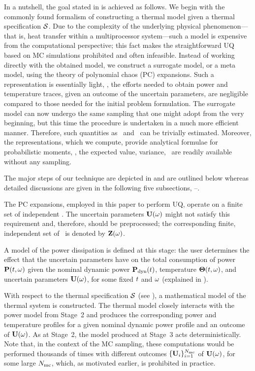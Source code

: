 In a nutshell, the goal stated in  is achieved as follows. We begin with the commonly found formalism of constructing a thermal model given a thermal specification $\mathcal{S}$. Due to the complexity of the underlying physical phenomenon---that is, heat transfer within a multiprocessor system---such a model is expensive from the computational perspective; this fact makes the straightforward UQ based on MC simulations prohibited and often infeasible. Instead of working directly with the obtained model, we construct a surrogate model, or a meta model, using the theory of polynomial chaos (PC) expansions. Such a representation is essentially light, \ie, the efforts needed to obtain power and temperature traces, given an outcome of the uncertain parameters, are negligible compared to those needed for the initial problem formulation. The surrogate model can now undergo the same sampling that one might adopt from the very beginning, but this time the procedure is undertaken in a much more efficient manner. Therefore, such quantities as \cdfs\ and \pdfs\ can be trivially estimated. Moreover, the representations, which we compute, provide analytical formulae for probabilistic moments, \ie, the expected value, variance, \etc\ are readily available without any sampling.

The major steps of our technique are depicted in  and are outlined below whereas detailed discussions are given in the following five subsections, --.

 The PC expansions, employed in this paper to perform UQ, operate on a finite set of independent \rvs. The uncertain parameters $\mathbf{U}(\omega)$ might not satisfy this requirement and, therefore, should be preprocessed; the corresponding finite, independent set of \rvs\ is denoted by $\mathbf{Z}(\omega)$.

 A model of the power dissipation is defined at this stage: the user determines the effect that the uncertain parameters have on the total consumption of power $\mathbf{P}(t, \omega)$ given the nominal dynamic power $\mathbf{P}_{\text{dyn}}(t)$, temperature ${\boldsymbol\Theta}(t, \omega)$, and uncertain parameters $\mathbf{U}(\omega)$, for some fixed $t$ and $\omega$ (explained in ).

 With respect to the thermal specification $\mathcal{S}$ (see ), a mathematical model of the thermal system is constructed. The thermal model closely interacts with the power model from Stage~2 and produces the corresponding power and temperature profiles for a given nominal dynamic power profile and an outcome of $\mathbf{U}(\omega)$. As at Stage~2, the model produced at Stage~3 acts deterministically. Note that, in the context of the MC sampling, these computations would be performed thousands of times with different outcomes $\{ \mathbf{U}_i \}_{i = 1}^{N_\text{mc}}$ of $\mathbf{U}(\omega)$, for some large $N_\text{mc}$, which, as motivated earlier, is prohibited in practice.

